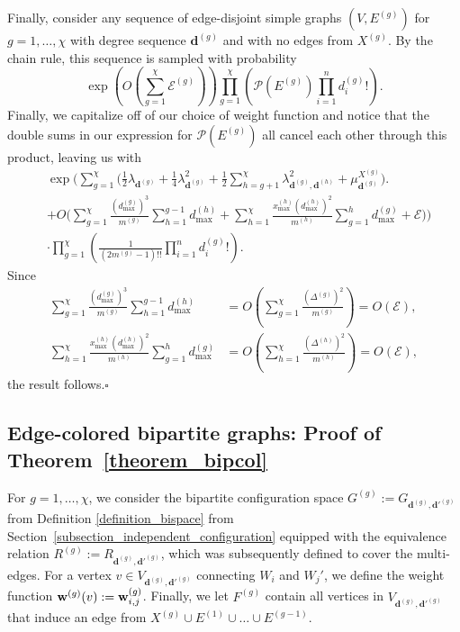 \documentclass{article}
\theoremstyle{plain}
\theoremstyle{remark}
\theoremstyle{plain}
\numberwithin{equation}{section}
\renewcommand{\d}{{\boldsymbol{d}}}
\renewcommand{\b}{{\bf{w}}}
\begin{document}
	Finally, consider any sequence of edge-disjoint simple graphs $(V,E^{(g)})$ for $g=1,\ldots,\chi$ with degree sequence $\d^{(g)}$ and with no edges from $X^{(g)}$. By the chain rule, this sequence is sampled with probability $$\exp\left(O\left(\sum_{g=1}^{\chi}\mathscr{E}^{(g)}\right)\right)\prod_{g=1}^{\chi}\left(\mathscr{P}(E^{(g)})\prod_{i=1}^{n}d_i^{(g)}!\right).$$ Finally, we capitalize off of our choice of weight function and notice that the double sums in our expression for $\mathscr{P}(E^{(g)})$ all cancel each other through this product, leaving us with
	\begin{align}
		&\exp\Bigg(\sum_{g=1}^{\chi}\Bigg(\tfrac12\lambda_{\d^{(g)}}+\tfrac14\lambda_{\d^{(g)}}^2+\tfrac12\sum_{h=g+1}^{\chi}\lambda_{\d^{(g)},\d^{(h)}}^2+\mu_{\d^{(g)}}^{X^{(g)}}\Bigg)\Bigg.
		\\&+O\Bigg(\sum_{g=1}^{\chi}\frac{(d_{\max}^{(g)})^3}{m^{(g)}}\sum_{h=1}^{g-1}d_{\max}^{(h)}+\sum_{h=1}^{\chi}\frac{x_{\max}^{(h)}(d_{\max}^{(h)})^2}{m^{(h)}}\sum_{g=1}^{h}d_{\max}^{(g)}+\mathscr{E}\Bigg)\Bigg)
		\\&\cdot\prod_{g=1}^{\chi}\left(\frac1{(2m^{(g)}-1)!!}\prod_{i=1}^{n}d_i^{(g)}!\right).
	\end{align}
	Since
	\begin{align}
		\sum_{g=1}^{\chi}\frac{(d_{\max}^{(g)})^3}{m^{(g)}}\sum_{h=1}^{g-1}d_{\max}^{(h)}&=O\left(\sum_{g=1}^{\chi}\frac{(\Delta^{(g)})^2}{m^{(g)}}\right)=O(\mathscr{E}),
		\\\sum_{h=1}^{\chi}\frac{x_{\max}^{(h)}(d_{\max}^{(h)})^2}{m^{(h)}}\sum_{g=1}^{h}d_{\max}^{(g)}&=O\left(\sum_{h=1}^{\chi}\frac{(\Delta^{(h)})^2}{m^{(h)}}\right)=O(\mathscr{E}),
	\end{align}
	the result follows.\hfill$\square$
	
	\subsection{Edge-colored bipartite graphs: Proof of Theorem~\ref{theorem_bipcol}}\label{subsection_applications_bipcol}
	
	For $g=1,\ldots,\chi$, we consider the bipartite configuration space $G^{(g)}:=G_{\d^{(g)},\d'^{(g)}}$ from Definition \ref{definition_bispace} from Section~\ref{subsection_independent_configuration} equipped with the equivalence relation $R^{(g)}:=R_{\d^{(g)},\d'^{(g)}}$, which was subsequently defined to cover the multi-edges. For a vertex $v\in V_{\d^{(g)},\d'^{(g)}}$ connecting $W_i$ and $W_j'$, we define the weight function $\b^{(g)}(v):=\b_{i,j}^{(g)}$. Finally, we let $F^{(g)}$ contain all vertices in $V_{\d^{(g)},\d'^{(g)}}$ that induce an edge from $X^{(g)}\cup E^{(1)}\cup\ldots\cup E^{(g-1)}$.
	
\end{document}
